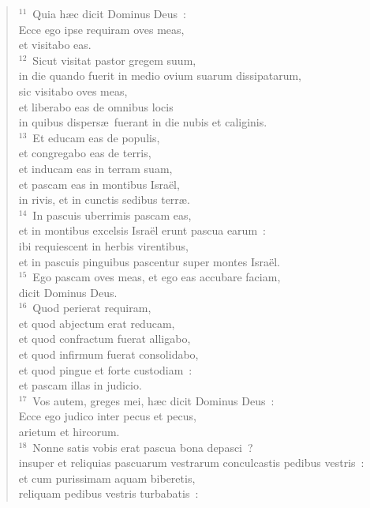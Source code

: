 \begin{flushleft}\begin{verse}${}^{11}$~Quia h\ae c dicit Dominus Deus~:\\ Ecce ego ipse requiram oves meas,\\ et visitabo eas.\\
${}^{12}$~Sicut visitat pastor gregem suum,\\ in die quando fuerit in medio ovium suarum dissipatarum,\\ sic visitabo oves meas,\\ et liberabo eas de omnibus locis\\ in quibus dispers\ae\ fuerant in die nubis et caliginis.\\
${}^{13}$~Et educam eas de populis,\\ et congregabo eas de terris,\\ et inducam eas in terram suam,\\ et pascam eas in montibus Isra\"el,\\ in rivis, et in cunctis sedibus terr\ae .\\
${}^{14}$~In pascuis uberrimis pascam eas,\\ et in montibus excelsis Isra\"el erunt pascua earum~:\\ ibi requiescent in herbis virentibus,\\ et in pascuis pinguibus pascentur super montes Isra\"el.\\
${}^{15}$~Ego pascam oves meas, et ego eas accubare faciam,\\ dicit Dominus Deus.\\
${}^{16}$~Quod perierat requiram,\\ et quod abjectum erat reducam,\\ et quod confractum fuerat alligabo,\\ et quod infirmum fuerat consolidabo,\\ et quod pingue et forte custodiam~:\\ et pascam illas in judicio.\\
${}^{17}$~Vos autem, greges mei, h\ae c dicit Dominus Deus~:\\ Ecce ego judico inter pecus et pecus,\\ arietum et hircorum.\\
${}^{18}$~Nonne satis vobis erat pascua bona depasci~?\\ insuper et reliquias pascuarum vestrarum conculcastis pedibus vestris~:\\ et cum purissimam aquam biberetis,\\ reliquam pedibus vestris turbabatis~:\\

\end{verse}
\end{flushleft}
